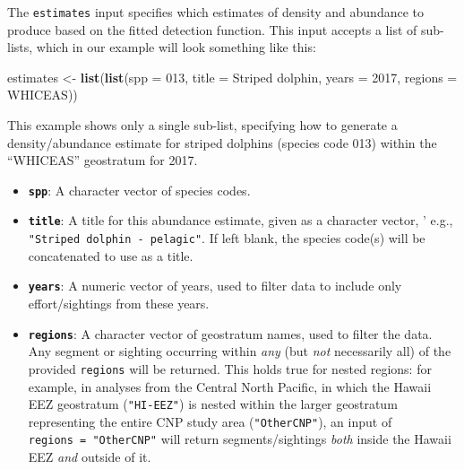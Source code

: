 \documentclass[
]{book}
\newenvironment{Shaded}{\begin{snugshade}}{\end{snugshade}}
\newcommand{\AttributeTok}[1]{\textcolor[rgb]{0.13,0.29,0.53}{#1}}
\newcommand{\DecValTok}[1]{\textcolor[rgb]{0.00,0.00,0.81}{#1}}
\newcommand{\FunctionTok}[1]{\textcolor[rgb]{0.13,0.29,0.53}{\textbf{#1}}}
\newcommand{\NormalTok}[1]{#1}
\newcommand{\OtherTok}[1]{\textcolor[rgb]{0.56,0.35,0.01}{#1}}
\newcommand{\StringTok}[1]{\textcolor[rgb]{0.31,0.60,0.02}{#1}}
\begin{document}
The \texttt{estimates} input specifies which estimates of density and abundance to produce based on the fitted detection function. This input accepts a list of sub-lists, which in our example will look something like this:

\begin{Shaded}
\begin{Highlighting}[]
\NormalTok{estimates }\OtherTok{\textless{}{-}} \FunctionTok{list}\NormalTok{(}\FunctionTok{list}\NormalTok{(}\AttributeTok{spp =} \StringTok{\textquotesingle{}013\textquotesingle{}}\NormalTok{,}
                       \AttributeTok{title =} \StringTok{\textquotesingle{}Striped dolphin\textquotesingle{}}\NormalTok{,}
                       \AttributeTok{years =} \DecValTok{2017}\NormalTok{,}
                       \AttributeTok{regions =} \StringTok{\textquotesingle{}WHICEAS\textquotesingle{}}\NormalTok{))}
\end{Highlighting}
\end{Shaded}

This example shows only a single sub-list, specifying how to generate a density/abundance estimate for striped dolphins (species code 013) within the ``WHICEAS'' geostratum for 2017.

\begin{itemize}
\item
  \textbf{\texttt{spp}}: A character vector of species codes.
\item
  \textbf{\texttt{title}}: A title for this abundance estimate, given as a character vector, ' e.g., \texttt{"Striped\ dolphin\ -\ pelagic"}. If left blank, the species code(s) will be concatenated to use as a title.
\item
  \textbf{\texttt{years}}: A numeric vector of years, used to filter data to include only effort/sightings from these years.
\item
  \textbf{\texttt{regions}}: A character vector of geostratum names, used to filter the data. Any segment or sighting occurring within \emph{any} (but \emph{not} necessarily all) of the provided \texttt{regions} will be returned. This holds true for nested regions: for example, in analyses from the Central North Pacific, in which the Hawaii EEZ geostratum (\texttt{"HI-EEZ"}) is nested within the larger geostratum representing the entire CNP study area (\texttt{"OtherCNP"}), an input of \texttt{regions\ =\ "OtherCNP"} will return segments/sightings \emph{both} inside the Hawaii EEZ \emph{and} outside of it.
\end{itemize}
\end{document}
